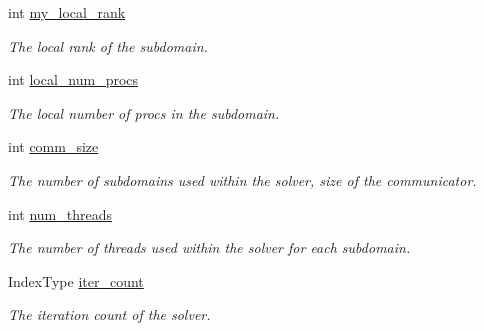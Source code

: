 \begin{DoxyCompactItemize}
\mbox{\label{structSchwarzWrappers_1_1Metadata_adb09627ec8c6ceb81713deeb55c84c39}} 
int \hyperlink{structSchwarzWrappers_1_1Metadata_adb09627ec8c6ceb81713deeb55c84c39}{my\+\_\+local\+\_\+rank}
\begin{DoxyCompactList}\small\item\em The local rank of the subdomain. \end{DoxyCompactList}\item 
\mbox{\label{structSchwarzWrappers_1_1Metadata_a22929421ded439dc35c70ef7b277bdbf}} 
int \hyperlink{structSchwarzWrappers_1_1Metadata_a22929421ded439dc35c70ef7b277bdbf}{local\+\_\+num\+\_\+procs}
\begin{DoxyCompactList}\small\item\em The local number of procs in the subdomain. \end{DoxyCompactList}\item 
\mbox{\label{structSchwarzWrappers_1_1Metadata_a2ace7a22b6cdab5ec94caa29e570f15c}} 
int \hyperlink{structSchwarzWrappers_1_1Metadata_a2ace7a22b6cdab5ec94caa29e570f15c}{comm\+\_\+size}
\begin{DoxyCompactList}\small\item\em The number of subdomains used within the solver, size of the communicator. \end{DoxyCompactList}\item 
\mbox{\label{structSchwarzWrappers_1_1Metadata_a7f103819460330d1e9fe00e8ed1d8f17}} 
int \hyperlink{structSchwarzWrappers_1_1Metadata_a7f103819460330d1e9fe00e8ed1d8f17}{num\+\_\+threads}
\begin{DoxyCompactList}\small\item\em The number of threads used within the solver for each subdomain. \end{DoxyCompactList}\item 
\mbox{\label{structSchwarzWrappers_1_1Metadata_a9f01a12998f9d59c2389c5ea9ad60782}} 
Index\+Type \hyperlink{structSchwarzWrappers_1_1Metadata_a9f01a12998f9d59c2389c5ea9ad60782}{iter\+\_\+count}
\begin{DoxyCompactList}\small\item\em The iteration count of the solver. \end{DoxyCompactList}\item 

\end{DoxyCompactItemize}
